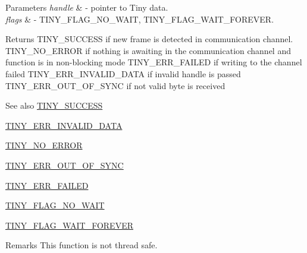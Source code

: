 \begin{DoxyParams}{Parameters}
{\em handle} & -\/ pointer to Tiny data. \\
\hline
{\em flags} & -\/ T\+I\+N\+Y\+\_\+\+F\+L\+A\+G\+\_\+\+N\+O\+\_\+\+W\+A\+I\+T, T\+I\+N\+Y\+\_\+\+F\+L\+A\+G\+\_\+\+W\+A\+I\+T\+\_\+\+F\+O\+R\+E\+V\+E\+R. \\
\hline
\end{DoxyParams}
\begin{DoxyReturn}{Returns}
T\+I\+N\+Y\+\_\+\+S\+U\+C\+C\+E\+S\+S if new frame is detected in communication channel. T\+I\+N\+Y\+\_\+\+N\+O\+\_\+\+E\+R\+R\+O\+R if nothing is awaiting in the communication channel and function is in non-\/blocking mode T\+I\+N\+Y\+\_\+\+E\+R\+R\+\_\+\+F\+A\+I\+L\+E\+D if writing to the channel failed T\+I\+N\+Y\+\_\+\+E\+R\+R\+\_\+\+I\+N\+V\+A\+L\+I\+D\+\_\+\+D\+A\+T\+A if invalid handle is passed T\+I\+N\+Y\+\_\+\+E\+R\+R\+\_\+\+O\+U\+T\+\_\+\+O\+F\+\_\+\+S\+Y\+N\+C if not valid byte is received
\end{DoxyReturn}
\begin{DoxySeeAlso}{See also}
\hyperlink{group__ERROR__FLAGS_ga16cd043c890ed1fa381b3a20f75a626c}{T\+I\+N\+Y\+\_\+\+S\+U\+C\+C\+E\+S\+S} 

\hyperlink{group__ERROR__FLAGS_ga541a9e67a84e39595ad647d641c4df2e}{T\+I\+N\+Y\+\_\+\+E\+R\+R\+\_\+\+I\+N\+V\+A\+L\+I\+D\+\_\+\+D\+A\+T\+A} 

\hyperlink{group__ERROR__FLAGS_ga69c869a686b67bf0b7b8115599515d61}{T\+I\+N\+Y\+\_\+\+N\+O\+\_\+\+E\+R\+R\+O\+R} 

\hyperlink{group__ERROR__FLAGS_gae1949de45d9c478830dad9c9b996193a}{T\+I\+N\+Y\+\_\+\+E\+R\+R\+\_\+\+O\+U\+T\+\_\+\+O\+F\+\_\+\+S\+Y\+N\+C} 

\hyperlink{group__ERROR__FLAGS_ga84e6ca143550038e1a71cf36078d1926}{T\+I\+N\+Y\+\_\+\+E\+R\+R\+\_\+\+F\+A\+I\+L\+E\+D} 

\hyperlink{group__FLAGS__GROUP_gadadd60eb21d7949e6d097ad36aab9b2e}{T\+I\+N\+Y\+\_\+\+F\+L\+A\+G\+\_\+\+N\+O\+\_\+\+W\+A\+I\+T} 

\hyperlink{group__FLAGS__GROUP_ga3a34267804581c5709d03f52d232b307}{T\+I\+N\+Y\+\_\+\+F\+L\+A\+G\+\_\+\+W\+A\+I\+T\+\_\+\+F\+O\+R\+E\+V\+E\+R} 
\end{DoxySeeAlso}
\begin{DoxyRemark}{Remarks}
This function is not thread safe. 
\end{DoxyRemark}
\hypertarget{group__ADVANCED__API_gaab48caab81a46d74fb52f2afb2649b61}{}
